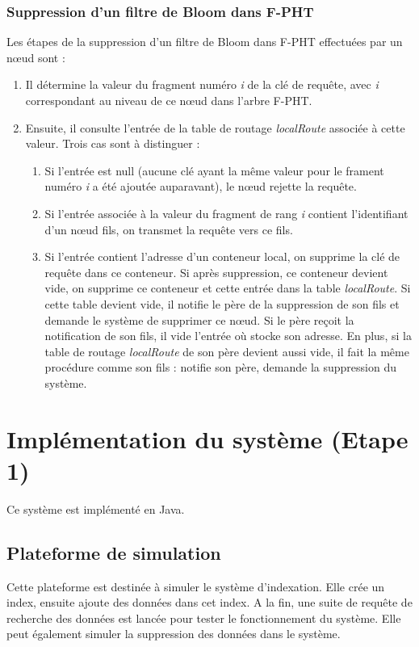 \documentclass[a4paper,11pt]{report}
\begin{document}
\subsection{Suppression d'un filtre de Bloom dans F-PHT}
	Les étapes de la suppression d'un filtre de Bloom dans F-PHT effectuées par un nœud sont :
	\begin{enumerate}
		\item Il détermine la valeur du fragment numéro \textit{i} de la clé de requête, avec \textit{i} correspondant au niveau de ce nœud dans l'arbre F-PHT.
		\item Ensuite, il consulte l'entrée de la table de routage \textit{localRoute} associée à cette valeur. Trois cas sont à distinguer :
		\begin{enumerate}
			\item Si l'entrée est null (aucune clé ayant la même valeur pour le frament numéro \textit{i} a été ajoutée auparavant), le nœud rejette la requête.
			\item Si l'entrée associée à la valeur du fragment de rang \textit{i} contient l'identifiant d'un nœud fils, on transmet la requête vers ce fils.
			\item Si l'entrée contient l'adresse d'un conteneur local, on supprime la clé de requête dans ce conteneur. Si après suppression, ce conteneur devient vide, on supprime ce conteneur et cette entrée dans la table \textit{localRoute}. Si cette table devient vide, il notifie le père de la suppression de son fils et demande le système de supprimer ce nœud. Si le père reçoit la notification de son fils, il vide l'entrée où stocke son adresse. En plus, si la table de routage \textit{localRoute} de son père devient aussi vide, il fait la même procédure comme son fils : notifie son père, demande la suppression du système.
		\end{enumerate}
	\end{enumerate}

\chapter{Implémentation du système (Etape 1)}
	Ce système est implémenté en Java.

\section{Plateforme de simulation}
	Cette plateforme est destinée à simuler le système d'indexation. Elle crée un index, ensuite ajoute des données dans cet index. A la fin, une suite de requête de recherche des données est lancée pour tester le fonctionnement du système. Elle peut également simuler la suppression des données dans le système.
		
\end{document}
